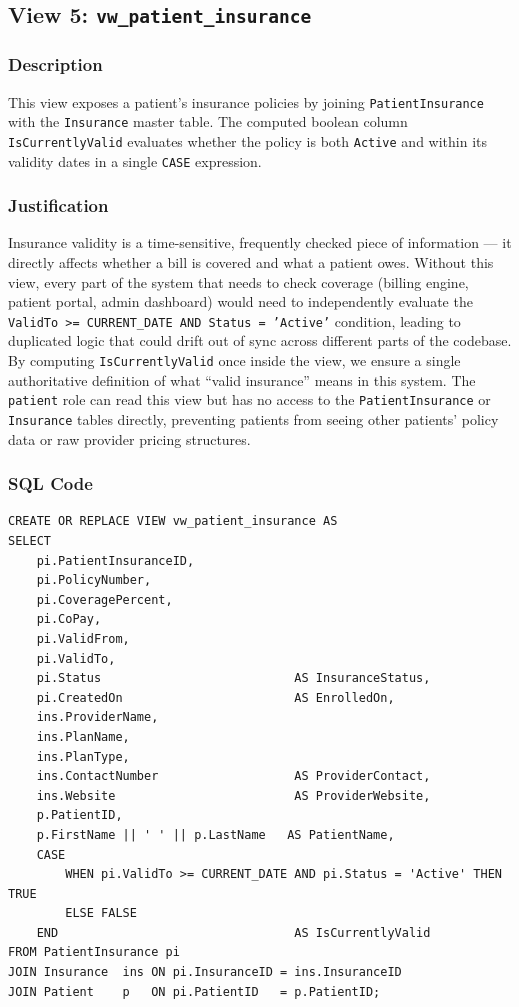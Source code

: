 \documentclass{article}
\begin{document}
\subsection{View 5: \texttt{vw\_patient\_insurance}}

\subsubsection{Description}
This view exposes a patient's insurance policies by joining \texttt{PatientInsurance} with the \texttt{Insurance} master table. The computed boolean column \texttt{IsCurrentlyValid} evaluates whether the policy is both \texttt{Active} and within its validity dates in a single \texttt{CASE} expression.

\subsubsection{Justification}
Insurance validity is a time-sensitive, frequently checked piece of information --- it directly affects whether a bill is covered and what a patient owes. Without this view, every part of the system that needs to check coverage (billing engine, patient portal, admin dashboard) would need to independently evaluate the \texttt{ValidTo >= CURRENT\_DATE AND Status = 'Active'} condition, leading to duplicated logic that could drift out of sync across different parts of the codebase. By computing \texttt{IsCurrentlyValid} once inside the view, we ensure a single authoritative definition of what ``valid insurance'' means in this system. The \texttt{patient} role can read this view but has no access to the \texttt{PatientInsurance} or \texttt{Insurance} tables directly, preventing patients from seeing other patients' policy data or raw provider pricing structures.

\subsubsection{SQL Code}

\begin{lstlisting}
CREATE OR REPLACE VIEW vw_patient_insurance AS
SELECT
    pi.PatientInsuranceID,
    pi.PolicyNumber,
    pi.CoveragePercent,
    pi.CoPay,
    pi.ValidFrom,
    pi.ValidTo,
    pi.Status                           AS InsuranceStatus,
    pi.CreatedOn                        AS EnrolledOn,
    ins.ProviderName,
    ins.PlanName,
    ins.PlanType,
    ins.ContactNumber                   AS ProviderContact,
    ins.Website                         AS ProviderWebsite,
    p.PatientID,
    p.FirstName || ' ' || p.LastName   AS PatientName,
    CASE
        WHEN pi.ValidTo >= CURRENT_DATE AND pi.Status = 'Active' THEN TRUE
        ELSE FALSE
    END                                 AS IsCurrentlyValid
FROM PatientInsurance pi
JOIN Insurance  ins ON pi.InsuranceID = ins.InsuranceID
JOIN Patient    p   ON pi.PatientID   = p.PatientID;
\end{lstlisting}
\end{document}
